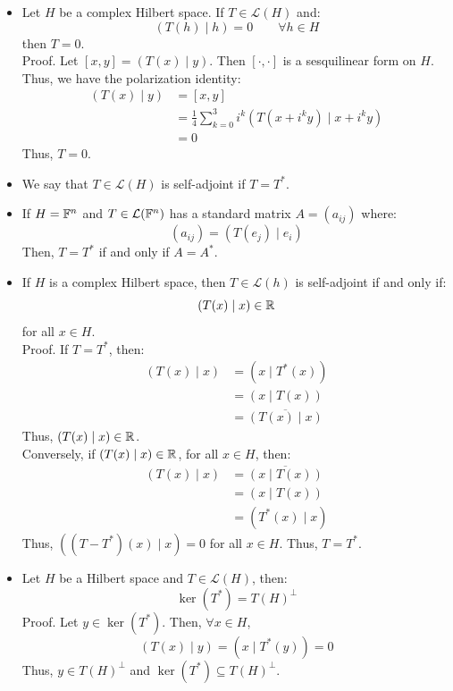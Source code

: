 \documentclass[12pt]{article}
\begin{document}
\begin{itemize}
    \[ T(x,y) = (-y, x)\]
    Note that $(T(h) \mid h) = 0$ for all $h \in \R^2$.
    \item[Prop.] Let $H$ be a complex Hilbert space. If $T \in \mathcal{L}(H)$ and: 
    \[ (T(h) \mid h) = 0 \qquad \forall h \in H\]
    then $T = 0$. \\
    Proof. Let $[x, y] = (T(x) \mid y)$. Then $[\cdot, \cdot]$ is a sesquilinear form on $H$. \\ 
    Thus, we have the polarization identity: 
    \begin{align*}
        (T(x) \mid y) &= [x, y] \\
        &= \frac 14 \sum_{k=0}^3 i^k (T(x + i^k y) \mid x + i^k y) \\
        &= 0
    \end{align*}
    Thus, $T = 0$. 
    \item[Defn.] We say that $T \in \mathcal{L}(H)$ is self-adjoint if $T = T^*$.
    \item[Ex.] If $H = \mathbb F^n$ and $T \in \mathcal L(\mathbb F^n)$ has a standard matrix $A = (a_{ij})$ where: 
    \[ (a_{ij}) = (T(e_j) \mid e_i)\]
    Then, $T = T^*$ if and only if $A = A^*$.
    \item[Cor.] If $H$ is a complex Hilbert space, then $T \in \mathcal L(h)$ is self-adjoint if and only if: 
    \[ (T(x) \mid x) \in \mathbb R\]
    for all $x \in H$. \\
    Proof. If $T = T^*$, then: 
    \begin{align*}
        (T(x) \mid x) &= (x \mid T^*(x)) \\
        &= (x \mid T(x)) \\
        &= \overline{(T(x) \mid x)}
    \end{align*}
    Thus, $(T(x) \mid x) \in \mathbb R$. \\
    Conversely, if $(T(x) \mid x) \in \mathbb R$, for all $x \in H$, then:
    \begin{align*}
        (T(x) \mid x) &= \overline{(x \mid T(x))} \\
        &= (x \mid T(x)) \\
        &= (T^*(x) \mid x)
    \end{align*}
    Thus, $((T-T^*)(x) \mid x) = 0$ for all $x \in H$. Thus, $T = T^*$. 
    \item[Prop.] Let $H$ be a Hilbert space and $T \in \mathcal L(H)$, then: 
    \[ \ker(T^*) = T(H)^\perp\]
    Proof. Let $y \in \ker(T^*)$. Then, $\forall x \in H$, 
    \[(T(x) \mid y) = (x \mid T^*(y)) = 0\]
    Thus, $y \in T(H)^\perp$ and $\ker(T^*) \subseteq T(H)^\perp$. \\

\end{itemize}
\end{document}
